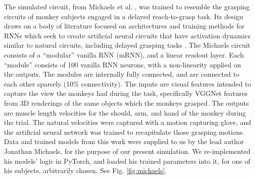 \documentclass[12pt]{iopart}
\begin{document}
The simulated circuit, from Michaels et al. \cite{michaels.mrnn}, was trained
to resemble the grasping circuits of monkey subjects engaged in a delayed reach-to-grasp task.
Its design draws on a body of literature focused on architectures and training methods for RNNs which
seek to create artificial neural circuits that have activation dynamics similar to natural circuits,
including delayed grasping tasks \cite{susillo.mrnn}. The Michaels circuit consists of a
``modular'' vanilla RNN (mRNN), and a linear readout layer. Each ``module'' consists of 100 vanilla
RNN neurons, with a non-linearity applied on the outputs. The modules are internally fully connected,
and are connected to each other sparsely (10\% connectivity). The inputs are visual features
intended to capture the view the monkeys had during the task, specifically VGGNet features from 3D
renderings of the same objects which the monkeys grasped. The outputs are muscle length
velocities for the should, arm, and hand of the monkey during the trial. The natural
velocities were captured with a motion capturing glove, and the artificial neural network
was trained to recapitulate those grasping motions. Data and trained models from this work
were supplied to us by the lead author Jonathan Michaels, for the purpose of our present
simulation. We re-implemented his models' logic in PyTorch, and loaded his trained parameters
into it, for one of his subjects, arbitrarily chosen. See Fig. \ref{fig:michaels}.
\end{document}
